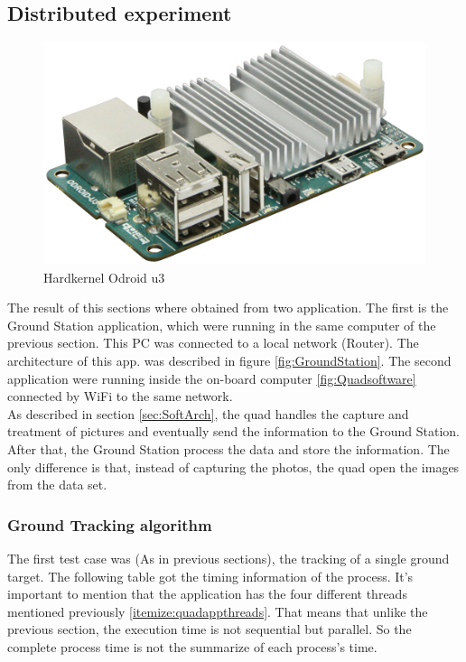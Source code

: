 	\newpage
	
\subsection{Distributed experiment}
	\label{test_with_odroid_and_GT}
	
	\begin{figure}
		\includegraphics[width=\linewidth]{../Images/c4/odroidu3}
		\caption{Hardkernel Odroid u3}
		\label{fig:odroidu3}
	\end{figure}
		
	The result of this sections where obtained from two application. The first is the Ground Station application, which were running in the same computer of the previous section. This PC was connected to a local network (Router). The architecture of this app.  was described in figure \ref{fig:GroundStation}.	The second application were running inside the on-board computer \ref{fig:Quadsoftware} connected by WiFi to the same network. \\
	
	As described in section \ref{sec:SoftArch}, the quad handles the capture and treatment of pictures and eventually send the information to the Ground Station. After that, the Ground Station process the data and store the information. The only difference is that, instead of capturing the photos, the quad open the images from the data set.
	
	
	\subsubsection{Ground Tracking algorithm}
	
	The first test case was (As in previous sections), the tracking of a single ground target. The following table got the timing information of the process. It's important to mention that the application has the four different threads mentioned previously \ref{itemize:quadappthreads}. That means that unlike the previous section, the execution time is not sequential but parallel. So the complete process time is not the summarize of each process's time.
	
